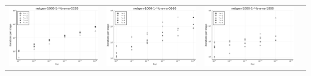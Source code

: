 \documentclass{article}
\begin{document}
\begin{landscape}
\begin{center}
\begin{longtable}{| c | c | c | c |}
\includegraphics[height=0.22\textheight]{itepst_fixlim_netgen-1000-1-_-b-a-ns-0330.png} &
\includegraphics[height=0.22\textheight]{itepst_fixlim_netgen-1000-1-_-b-a-ns-0660.png} &
\includegraphics[height=0.22\textheight]{itepst_fixlim_netgen-1000-1-_-b-a-ns-1000.png} \\

\end{longtable}
\end{center}
\end{landscape}
\end{document}
